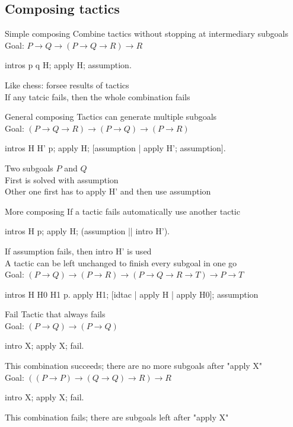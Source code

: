 \subsection{Composing tactics}
\begin{frame}[fragile]{Simple composing}
	Combine tactics without stopping at intermediary subgoals\\
	\pause
	\medskip
	Goal: $P \rightarrow Q \rightarrow (P \rightarrow Q \rightarrow R) \rightarrow R$
	\pause
	\begin{user}
	intros p q H; apply H; assumption.
	\end{user}
	\pause
	Like chess: forsee results of tactics\\
	\pause
	\medskip
	If any tatcic fails, then the whole combination fails
\end{frame}
\begin{frame}[fragile]{General composing}
	Tactics can generate multiple subgoals \\
	\pause
	\medskip
	Goal: $(P \rightarrow Q \rightarrow R) \rightarrow (P \rightarrow Q) \rightarrow (P \rightarrow R)$
	\pause
	\begin{user}
	intros H H' p; apply H; [assumption | apply H'; assumption].
	\end{user}
	\pause
	Two subgoals $P$ and $Q$\\
	\pause
	\medskip
	First is solved with assumption\\
	\pause
	Other one first has to apply H' and then use assumption
\end{frame}
\begin{frame}[fragile]{More composing}
	If a tactic fails automatically use another tactic
	\pause
	\begin{user}
	intros H p; apply H; (assumption || intro H').
	\end{user}
	\pause
	If assumption fails, then intro H' is used\\
	\pause
	\bigskip
	A tactic can be left unchanged to finish every subgoal in one go\\
	\pause
	\smallskip
	Goal: $(P \rightarrow Q) \rightarrow (P \rightarrow R) \rightarrow (P \rightarrow Q \rightarrow R \rightarrow T) \rightarrow P \rightarrow T$
	\pause
	\begin{user}
		intros H H0 H1 p.
		apply H1; [idtac | apply H | apply H0]; assumption
	\end{user}
\end{frame}
\begin{frame}[fragile]{Fail}
	Tactic that always fails \\
	\pause
	\medskip
	Goal: $(P \rightarrow Q) \rightarrow (P \rightarrow Q)$
	\pause
	\begin{user}
	intro X; apply X; fail.
	\end{user}
	\pause
	This combination succeeds; there are no more subgoals after "apply X"\\
	\pause
	\medskip
	Goal: $((P \rightarrow P) \rightarrow (Q \rightarrow Q) \rightarrow R) \rightarrow R$
	\begin{user}
	intro X; apply X; fail.
	\end{user}
	\pause
	This combination fails; there are subgoals left after "apply X"
\end{frame}
